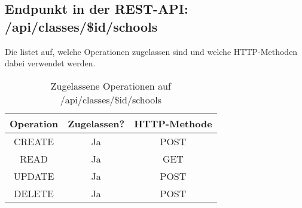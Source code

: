\subsection{Endpunkt in der REST-API: /api/classes/\$id/schools}
Die  listet auf, welche Operationen zugelassen sind und welche HTTP-Methoden dabei verwendet werden. 

\begin{table}[!htbp]
	\begin{tabular}{|c|c|c|}
		\hline
			\textbf{Operation} & \textbf{Zugelassen?} & \textbf{HTTP-Methode} \\ \hline
			CREATE & Ja & POST \\ \hline 
			READ & Ja & GET \\ \hline
			UPDATE & Ja & POST \\ \hline 
			DELETE & Ja & POST \\ \hline
	\end{tabular}

		\caption{Zugelassene Operationen auf /api/classes/\$id/schools}
		\label{tab:rest:api:classes:id:schools:meth}
\end{table}